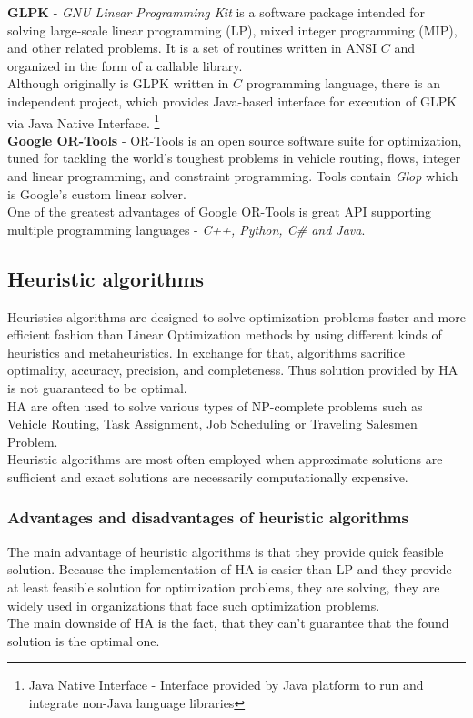 \textbf{GLPK} - \textit{GNU Linear Programming Kit} is a software package intended for solving large-scale linear programming (LP),
mixed integer programming (MIP), and other related problems.
It is a set of routines written in ANSI $C$ and organized in the form of a callable library.\cite{web:gnuGlpk}\\
Although originally is GLPK written in $C$ programming language,
there is an independent project,
which provides Java-based interface for execution of GLPK via Java Native Interface.
\footnote{Java Native Interface - Interface provided by Java platform to run and integrate non-Java language libraries}\\

\textbf{Google OR-Tools} - OR-Tools is an open source software suite for optimization,
tuned for tackling the world's toughest problems in vehicle routing, flows,
integer and linear programming, and constraint programming.\cite{web:googleOrTools}
Tools contain \textit{Glop} which is Google's custom linear solver.\\
One of the greatest advantages of Google OR-Tools is great API supporting multiple programming languages - \textit{C++, Python, C\# and Java}.


\subsection{Heuristic algorithms}\label{subsec:heuristic-algorithms}
Heuristics algorithms are designed to solve optimization problems faster
and more efficient fashion than Linear Optimization methods by using different kinds of heuristics and metaheuristics.
In exchange for that, algorithms sacrifice optimality, accuracy, precision, and completeness.
Thus solution provided by HA is not guaranteed to be optimal.\\
HA are often used to solve various types of NP-complete problems such as
Vehicle Routing, Task Assignment, Job Scheduling or Traveling Salesmen Problem.\\
Heuristic algorithms are most often employed when approximate solutions are sufficient
and exact solutions are necessarily computationally expensive.\cite{papanikolaou2018holistic}

\subsubsection{Advantages and disadvantages of heuristic algorithms}
The main advantage of heuristic algorithms is that they provide quick feasible solution.
Because the implementation of HA is easier than LP and they provide at least feasible solution for optimization problems,
they are solving, they are widely used in organizations that face such optimization problems.\\
The main downside of HA is the fact, that they can't guarantee that the found solution is the optimal one.


